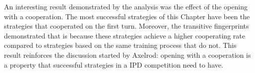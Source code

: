 An interesting result demonstrated by the analysis was the effect of the opening
with a cooperation. The most successful strategies of this Chapter have been
the strategies that cooperated on the first turn. Moreover, the transitive
fingerprints demonstrated that is because these strategies achieve a higher
cooperating rate compared to strategies based on the same training process
that do not. This result reinforces the discussion started by
Axelrod: opening with a cooperation is a property that
successful strategies in a IPD competition need to have.
